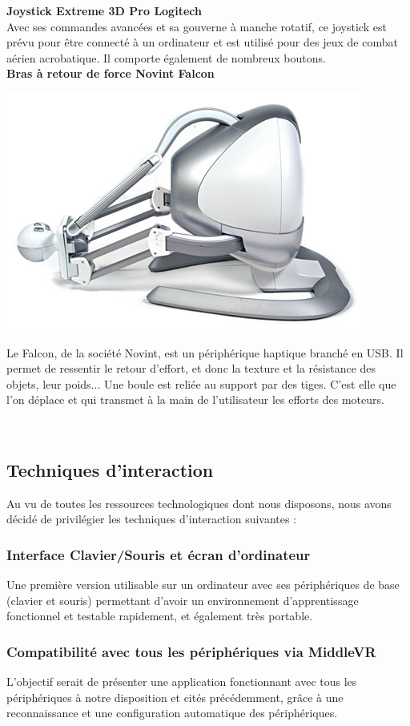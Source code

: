 \textbf{Joystick Extreme 3D Pro Logitech}
\\

Avec ses commandes avancées et sa gouverne à manche rotatif, ce joystick est prévu pour être connecté à un ordinateur et est utilisé pour des jeux de combat aérien acrobatique. Il comporte également de nombreux boutons.
\\

\textbf{Bras à retour de force Novint Falcon}
\\
\noindent\begin{minipage}{0.3\textwidth}
			\includegraphics[width=\linewidth]{1-PreEtude/img/falcon}
			\end{minipage}
			\hfill
			\begin{minipage}{0.65\textwidth}
			Le Falcon, de la société Novint, est un périphérique haptique branché en USB. Il permet de ressentir le retour d'effort, et donc la texture et la résistance des objets, leur poids... Une boule est reliée au support par des tiges. C'est elle que l'on déplace et qui transmet à la main de l'utilisateur les efforts des moteurs.
		\end{minipage}
\\

\subsection{Techniques d'interaction}
Au vu de toutes les ressources technologiques dont nous disposons, nous avons décidé de privilégier les techniques d'interaction suivantes :

\subsubsection{Interface Clavier/Souris et écran d'ordinateur}
Une première version utilisable sur un ordinateur avec ses périphériques de base (clavier et souris) permettant d'avoir un environnement d'apprentissage fonctionnel et testable rapidement, et également très portable.

\subsubsection{Compatibilité avec tous les périphériques via MiddleVR}
L'objectif serait de présenter une application fonctionnant avec tous les périphériques à notre disposition et cités précédemment, grâce à une reconnaissance et une configuration automatique des périphériques.
\\
